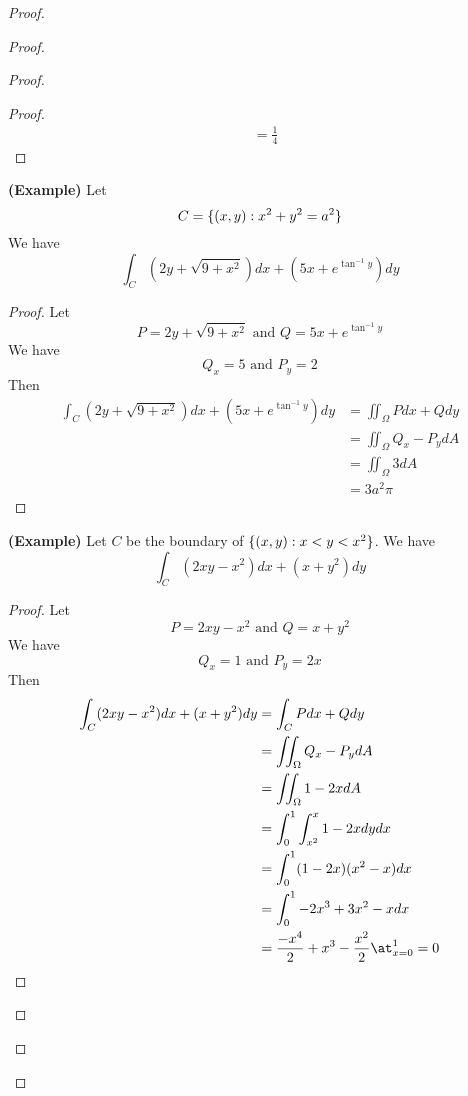 \documentclass{report}
\begin{document}
\begin{proof}
\begin{proof}
\begin{proof}
\begin{proof}
\begin{align*}
&=\frac{1}{4}
\end{align*}
\end{proof}
\begin{theorem}
\label{7.3.13}
\textbf{(Example)} Let 
\begin{equation*}
C=\{ (x,y):x^2+y^2=a^2 \}
\end{equation*}
We have
\begin{equation*}
\int_C (2y+\sqrt{9+x^2} )dx+(5x+e^{\tan^{-1}y})dy
\end{equation*}
\end{theorem}
\begin{proof}
Let 
\begin{equation*}
P=2y+\sqrt{9+x^2}\text{ and }Q=5x+e^{\tan^{-1} y} 
\end{equation*}
We have
\begin{equation*}
Q_x=5\text{ and }P_y=2
\end{equation*}
Then
\begin{align*}
\int_C (2y+\sqrt{9+x^2} )dx+(5x+e^{\tan^{-1}y})dy&=\iint_{\Omega} Pdx+Qdy\\
&=\iint_\Omega Q_x-P_y dA\\
&=\iint_{\Omega}3dA\\
&=3a^2\pi
\end{align*}
\end{proof}
\begin{theorem}
\label{7.3.14}
\textbf{(Example)}
Let $C$ be the boundary of  $\{ (x,y):x<y<x^2 \}$. We have
\begin{equation*}
\int_C (2xy-x^2)dx+(x+y^2)dy
\end{equation*}
\end{theorem}
\begin{proof}
Let
\begin{equation*}
P=2xy-x^2\text{ and }Q=x+y^2
\end{equation*}
We have
\begin{equation*}
Q_x=1\text{ and }P_y=2x
\end{equation*}
Then
\begin{align*}
\int_C (2xy-x^2)dx+(x+y^2)dy&=\int_C Pdx+Qdy\\
&=\iint_\Omega Q_x-P_y dA\\
&=\iint_\Omega 1-2x dA\\
&=\int_0^1\int_{x^2}^{x} 1-2x dydx\\
&=\int_0^1 (1-2x)(x^2-x)dx\\
&=\int_0^1 -2x^3+3x^2-xdx\\
&=\frac{-x^4}{2}+x^3 -\frac{x^2}{2}\at_{x=0}^1=0

\end{align*}
\end{proof}
\end{proof}
\end{proof}
\end{proof}
\end{document}
